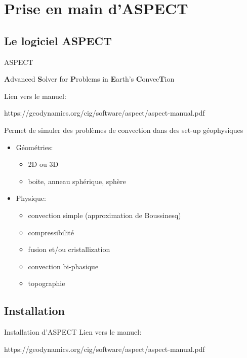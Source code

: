 \documentclass[9pt]{beamer}
\begin{document}


\section{Prise en main d'ASPECT}




\subsection{Le logiciel ASPECT}
\begin{frame}{ASPECT}

    \textbf{A}dvanced \textbf{S}olver for \textbf{P}roblems in \textbf{E}arth’s \textbf{C}onvec\textbf{T}ion
    
    
    Lien vers le manuel:
    
    https://geodynamics.org/cig/software/aspect/aspect-manual.pdf
    
    Permet de simuler des problèmes de convection dans des set-up géophysiques
    \begin{itemize}
        \item Géométries:
        \begin{itemize}
            \item 2D ou 3D
            \item boite, anneau sphérique, sphère
        \end{itemize}
        \item Physique:
        \begin{itemize}
            \item convection simple (approximation de Boussinesq)
            \item compressibilité
            \item fusion et/ou cristallization
            \item convection bi-phasique
            \item topographie
        \end{itemize}
    \end{itemize}
    
    
\end{frame}

{

}



\subsection{Installation}
\begin{frame}{Installation d'ASPECT}
    Lien vers le manuel:
    
    https://geodynamics.org/cig/software/aspect/aspect-manual.pdf
\end{frame}
\end{document}

